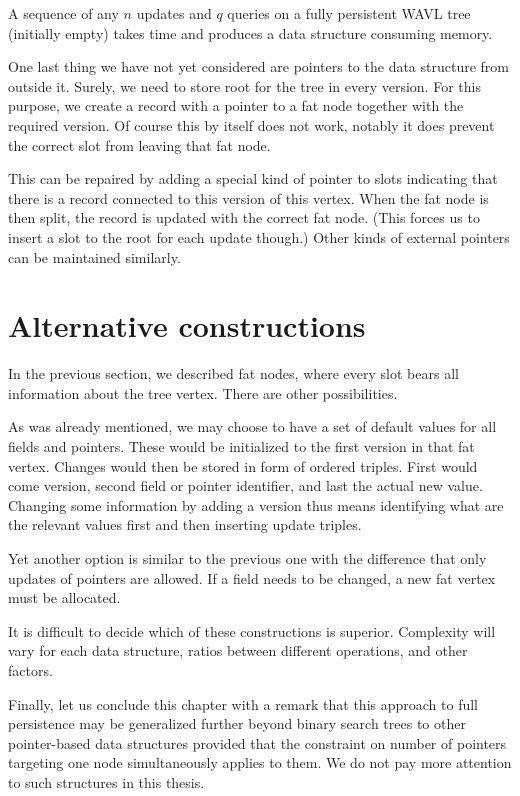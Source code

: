 \begin{cor}
A sequence of any $n$ updates and $q$ queries on a fully persistent WAVL tree (initially empty) takes  time and produces a data structure consuming  memory.
\end{cor}

One last thing we have not yet considered are pointers to the data structure from outside it. Surely, we need to store root for the tree in every version. For this purpose, we create a record with a pointer to a fat node together with the required version. Of course this by itself does not work, notably it does prevent the correct slot from leaving that fat node. 

This can be repaired by adding a special kind of pointer to slots indicating that there is a record connected to this version of this vertex. When the fat node is then split, the record is updated with the correct fat node. (This forces us to insert a slot to the root for each update though.) Other kinds of external pointers can be maintained similarly.

\section{Alternative constructions}

In the previous section, we described fat nodes, where every slot bears all information about the tree vertex. There are other possibilities.

As was already mentioned, we may choose to have a set of default values for all fields and pointers.
These would be initialized to the first version in that fat vertex. Changes would then be stored in form of ordered triples. First would come version, second field or pointer identifier, and last the actual new value. Changing some information by adding a version thus means identifying what are the relevant values first and then inserting update triples.

Yet another option is similar to the previous one with the difference that only updates of pointers are allowed. If a field needs to be changed, a new fat vertex must be allocated.

It is difficult to decide which of these constructions is superior. Complexity will vary for each data structure, ratios between different operations, and other factors.

Finally, let us conclude this chapter with a remark that this approach to full persistence may be generalized further beyond binary search trees to other pointer-based data structures provided that the constraint on number of pointers targeting one node simultaneously applies to them.
We do not pay more attention to such structures in this thesis.
